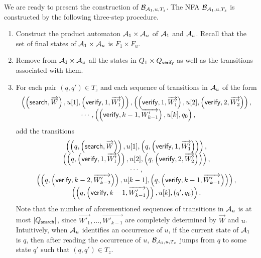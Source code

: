We are ready to present the construction of $\mathcal{B}_{\mathcal{A}_1, u,  T_{z}}$. The NFA $\mathcal{B}_{\mathcal{A}_1, u,  T_{z}}$ is constructed by the following three-step procedure.
\begin{enumerate}
\item Construct the product automaton $\mathcal{A}_1 \times \mathcal{A}_u$ of $\mathcal{A}_1$ and $\mathcal{A}_u$. Recall that the set of final states of $\mathcal{A}_1 \times \mathcal{A}_u$ is $F_1 \times F_u$. 

\item Remove from $\mathcal{A}_1 \times \mathcal{A}_u$ all the states in $Q_1 \times Q_{\mathsf{verify}}$ as well as the transitions associated with them.

\item For each pair $(q,q') \in T_{z}$ and each sequence of transitions in $\mathcal{A}_u$ of the form 
$$
\begin{array}{l}
\left( \left(\search, \overrightarrow{W} \right), u[1], \left(\verify, 1, \overrightarrow{W'_1} \right) \right), \left( \left(\verify, 1, \overrightarrow{W'_1} \right), u[2], 
 \left(\verify, 2, \overrightarrow{W'_2}\right) \right), \\
 \hspace{3cm} \cdots, \left(\left(\verify, k-1, \overrightarrow{W'_{k-1}} \right), u[k], q_0\right),
\end{array}
$$ 
add the transitions
$$
\begin{array}{c}
\left( \left(q, \left(\mathsf{search}, \overrightarrow{W} \right) \right), u[1], \left(q, \left(\mathsf{verify}, 1, \overrightarrow{W'_1} \right) \right) \right), \\
\left( \left(q, \left(\mathsf{verify}, 1, \overrightarrow{W'_1} \right) \right), u[2], \left(q, \left(\mathsf{verify}, 2, \overrightarrow{W'_2}\right)\right)\right),  \\
\cdots, \\
\left(\left(q, \left(\mathsf{verify}, k-2, \overrightarrow{W'_{k-2}} \right) \right), u[k-1], \left (q, \left (\mathsf{verify}, k-1, \overrightarrow{W'_{k-1}} \right) \right) \right),\\ \left( \left(q, \left (\mathsf{verify}, k-1, \overrightarrow{W'_{k-1}} \right) \right), u[k], \left(q', q_0 \right)\right).
\end{array}
$$
Note that the number of aforementioned sequences of transitions in $\mathcal{A}_u$ is at most $|Q_{\mathsf{search}}|$, since  $ \overrightarrow{W'_1},\dots,  \overrightarrow{W'_{k-1}}$ are completely determined by $\overrightarrow{W} $ and $u$.
Intuitively, when $\mathcal{A}_u$ identifies an occurrence of $u$, if the current state of $\mathcal{A}_1$ is $q$, then after reading the occurrence of $u$, $\mathcal{B}_{\mathcal{A}_1, u, T_z}$ jumps from $q$ to some state $q'$ such that $(q,q') \in T_z$.
\end{enumerate}

\begin{example}
\end{example}

